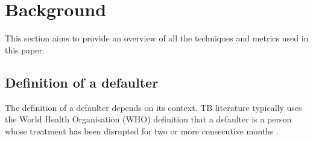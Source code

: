 \documentclass{sig-alternate-05-2015}
\begin{document}

	
	\section{Background}
	This section aims to provide an overview of all the techniques and metrics used in this paper.
	\subsection{Definition of a defaulter}
	The definition of a defaulter depends on its context. TB literature typically uses the World Health Organisation (WHO) definition that a defaulter is a person whose treatment has been disrupted for two or more consecutive months \cite{chan:2003prevalence, cherkaoui:19326203, Jha:10.1371/journal.pone.0008873,jittimanee:10.1111/j.1440-172X.2007.00650.x,muture:6660173120110101, world2015TB}.
	
\end{document}
